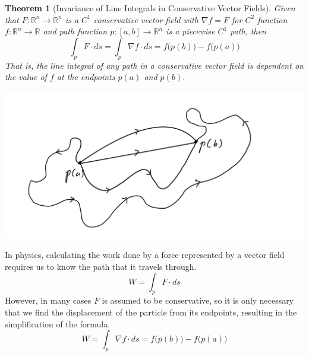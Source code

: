 \documentclass{article}
\newtheorem{theorem}{Theorem}[section]
\theoremstyle{remark}
\theoremstyle{definition}
\begin{document}
\begin{theorem}[Invariance of Line Integrals in Conservative Vector Fields]
Given that $F: \mathbb{R}^n \longrightarrow \mathbb{R}^n$ is a $C^1$ conservative vector field with $\nabla f = F$ for $C^2$ function $f: \mathbb{R}^n \longrightarrow \mathbb{R}$ and path function $p: [a,b] \longrightarrow \mathbb{R}^n$ is a piecewise $C^1$ path, then 
\[\int_p F \cdot d s = \int_p \nabla f \cdot d s = f\big(p(b)\big) - f\big(p(a)\big)\]
That is, the line integral of any path in a conservative vector field is dependent on the value of $f$ at the endpoints $p(a)$ and $p(b)$. 
\begin{center}
    \includegraphics[scale=0.2]{img/Line_Integral_Independence_of_path.PNG}
\end{center}
\end{theorem}

In physics, calculating the work done by a force represented by a vector field requires us to know the path that it travels through. 
\[W = \int_p F \cdot ds\]
However, in many cases $F$ is assumed to be conservative, so it is only necessary that we find the displacement of the particle from its endpoints, resulting in the simplification of the formula.  
\[W = \int_p \nabla f \cdot ds = f\big( p(b)\big) - f \big(p(a)\big)\]
\end{document}
